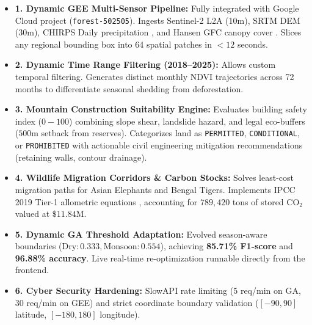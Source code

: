 \documentclass[11pt, a4paper]{article}
\begin{document}
\begin{itemize}[noitemsep, topsep=1pt]
    \item \textbf{1. Dynamic GEE Multi-Sensor Pipeline:} Fully integrated with Google Cloud project (\texttt{forest-502505}). Ingests Sentinel-2 L2A (10m), SRTM DEM (30m), CHIRPS Daily precipitation \cite{funk2015climate}, and Hansen GFC canopy cover \cite{hansen2013high}. Slices any regional bounding box into 64 spatial patches in $<12$ seconds.
    \item \textbf{2. Dynamic Time Range Filtering (2018--2025):} Allows custom temporal filtering. Generates distinct monthly NDVI trajectories across 72 months to differentiate seasonal shedding from deforestation.
    \item \textbf{3. Mountain Construction Suitability Engine:} Evaluates building safety index ($0 - 100$) combining slope shear, landslide hazard, and legal eco-buffers ($500\text{m}$ setback from reserves). Categorizes land as \texttt{PERMITTED}, \texttt{CONDITIONAL}, or \texttt{PROHIBITED} with actionable civil engineering mitigation recommendations (retaining walls, contour drainage).
    \item \textbf{4. Wildlife Migration Corridors \& Carbon Stocks:} Solves least-cost migration paths for Asian Elephants and Bengal Tigers. Implements IPCC 2019 Tier-1 allometric equations \cite{ipcc2019refinement, chave2014improved}, accounting for $789{,}420$ tons of stored $\text{CO}_2$ valued at $\$11.84\text{M}$.
    \item \textbf{5. Dynamic GA Threshold Adaptation:} Evolved season-aware boundaries ($\text{Dry}: 0.333, \text{Monsoon}: 0.554$), achieving \textbf{85.71\% F1-score} and \textbf{96.88\% accuracy}. Live real-time re-optimization runnable directly from the frontend.
    \item \textbf{6. Cyber Security Hardening:} SlowAPI rate limiting (5 req/min on GA, 30 req/min on GEE) and strict coordinate boundary validation ($[-90, 90]$ latitude, $[-180, 180]$ longitude).
\end{itemize}

\end{document}
